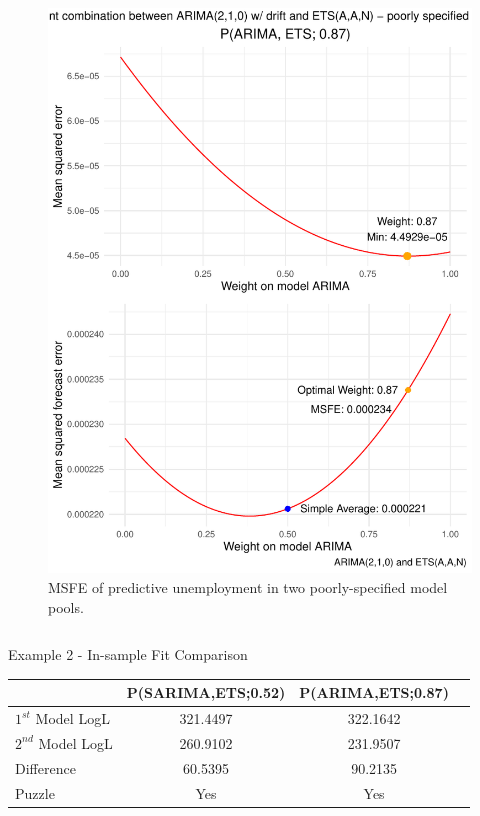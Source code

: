 \begin{frame}[plain]{}
\begin{columns}
    \begin{column}{0.5\textwidth}
        \begin{figure}[ht]
        \centering
        \includegraphics[scale=0.37]{Graph/EMPL_misspecified.pdf}
        \caption{\footnotesize{MSFE of predictive unemployment in two poorly-specified model pools.}}
        \end{figure}
    \end{column}
    \end{columns}

\end{frame}



\begin{frame}{Example 2 - In-sample Fit Comparison}

\begin{table}[ht]
  \centering
    \begin{tabular}{l|ccc}
    \toprule
        &   P(SARIMA,ETS;0.52)   &   P(ARIMA,ETS;0.87)  \\  
    \midrule
    $1^{st}$ Model LogL   &   321.4497   &    322.1642   \\
    $2^{nd}$ Model LogL   &   260.9102   &    231.9507   \\
    Difference            &   60.5395    &    90.2135    \\
    Puzzle                &    Yes       &     Yes       \\
    \bottomrule
    \end{tabular}
\end{table}
\end{frame}



